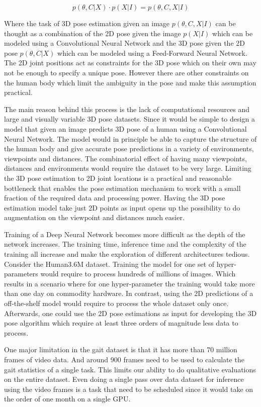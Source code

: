 \begin{equation}
    p(\theta,C|X) \cdot p(X|I)= p(\theta,C,X|I)
\end{equation}

Where the task of 3D pose estimation given an image $p(\theta,C,X|I)$ can be thought as a combination of the 2D pose given the image $p(X|I)$ which can be modeled using a Convolutional Neural Network and the 3D pose given the 2D pose $p(\theta,C|X)$ which can be modeled using a Feed-Forward Neural Network. The 2D joint positions act as constraints for the 3D pose which on their own may not be enough to specify a unique pose. However there are other constraints on the human body which limit the ambiguity in the pose and make this assumption practical. 

The main reason behind this process is the lack of computational resources and large and visually variable 3D pose datasets. Since it would be simple to design a model that given an image predicts 3D pose of a human using a Convolutional Neural Network. The model would in principle be able to capture the structure of the human body and give accurate pose predictions in a variety of environments, viewpoints and distances. The combinatorial effect of having many viewpoints, distances and environments would require the dataset to be very large. Limiting the 3D pose estimation to 2D joint locations is a practical and reasonable bottleneck that enables the pose estimation mechanism to work with a small fraction of the required data and processing power. Having the 3D pose estimation model take just 2D points as input opens up the possibility to do augmentation on the viewpoint and distances much easier. 

Training of a Deep Neural Network becomes more difficult as the depth of the network increases. The training time, inference time and the complexity of the training all increase and make the exploration of different architectures tedious. 
Consider the Human3.6M dataset. Training the model for one set of hyper-parameters would require to process hundreds of millions of images. Which results in a scenario where for one hyper-parameter the training would take more than one day on commodity hardware. In contrast, using the 2D predictions of a off-the-shelf model would require to process the whole dataset only once. Afterwards, one could use the 2D pose estimations as input for developing the 3D pose algorithm which require at least three orders of magnitude less data to process.

One major limitation in the gait dataset is that it has more than 70 million frames of video data. And around 900 frames need to be used to calculate the gait statistics of a single task. This limits our ability to do qualitative evaluations on the entire dataset. Even doing a single pass over data dataset for inference using the video frames is a task that need to be scheduled since it would take on the order of one month on a single GPU. 

